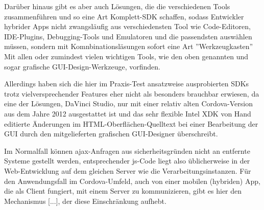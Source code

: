 Darüber hinaus gibt es aber auch Lösungen, die die verschiedenen Tools zusammenführen und so eine Art Komplett-SDK schaffen, sodass Entwickler hybrider Apps nicht zwangsläufig aus verschiedensten Tool wie Code-Editoren, IDE-Plugins, Debugging-Tools und Emulatoren und die passendsten auswählen müssen, sondern mit Komnbinationsläsungen sofort eine Art ”Werkzeugkasten”  Mit allen oder zumindest vielen wichtigen Tools, wie den oben genannten und sogar grafische GUI-Design-Werkzeuge, vorfinden.




Allerdings haben sich die hier im Praxis-Test ansatzweise ausprobierten SDKs trotz vielversprechender Features eher nicht als besonders brauchbar erwiesen, da eine der Lösungen, DaVinci Studio, nur mit einer relativ alten Cordova-Version aus dem Jahre 2012 ausgestattet ist und das sehr flexible Intel XDK von Hand editierte Änderungen im HTML-Oberflächen-Quelltext bei einer Bearbeitung der GUI durch den mitgelieferten grafischen GUI-Designer überschreibt.








Im Normalfall können ajax-Anfragen aus sicherheitsgründen nicht an entfernte Systeme gestellt werden, entsprechender \gls{js}-Code liegt also üblicherweise in der Web-Entwicklung auf dem gleichen Server wie die Verarbeitungsinstanzen. 
Für den Anwendungsfall im Cordova-Umfeld, auch von einer mobilen (hybriden) App, die als Client fungiert, mit einem Server zu kommunizieren, gibt es hier den Mechanismus [...], der diese Einschränkung aufhebt. %





















